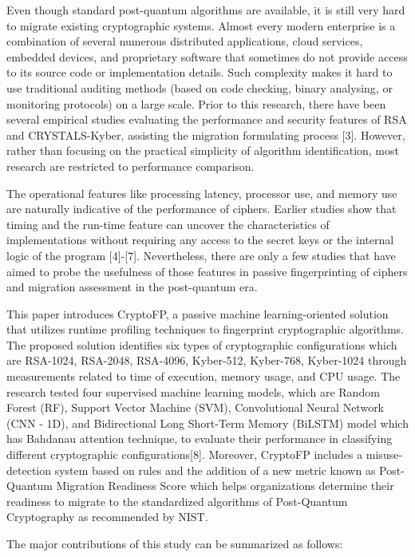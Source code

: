 \documentclass[conference]{IEEEtran}
\begin{document}
Even though standard post-quantum algorithms are available, it is still very hard to migrate existing cryptographic systems. Almost every modern enterprise is a combination of several numerous distributed applications, cloud services, embedded devices, and proprietary software that sometimes do not provide access to its source code or implementation details. Such complexity makes it hard to use traditional auditing methods (based on code checking, binary analysing, or monitoring protocols) on a large scale. Prior to this research, there have been several empirical studies evaluating the performance and security features of RSA and CRYSTALS-Kyber, assisting the migration formulating process [3]. However, rather than focusing on the practical simplicity of algorithm identification, most research are restricted to performance comparison.

The operational features like processing latency, processor use, and memory use are naturally indicative of the performance of ciphers. Earlier studies show that timing and the run-time feature can uncover the characteristics of implementations without requiring any access to the secret keys or the internal logic of the program [4]-[7]. Nevertheless, there are only a few studies that have aimed to probe the usefulness of those features in passive fingerprinting of ciphers and migration assessment in the post-quantum era.

This paper introduces CryptoFP, a passive machine learning-oriented solution that utilizes runtime profiling techniques to fingerprint cryptographic algorithms. The proposed solution identifies six types of cryptographic configurations which are RSA-1024, RSA-2048, RSA-4096, Kyber-512, Kyber-768, Kyber-1024 through measurements related to time of execution, memory usage, and CPU usage. The research tested four supervised machine learning models, which are Random Forest (RF), Support Vector Machine (SVM), Convolutional Neural Network (CNN - 1D), and Bidirectional Long Short-Term Memory (BiLSTM) model which has Bahdanau attention technique, to evaluate their performance in classifying different cryptographic configurations[8]. Moreover, CryptoFP includes a misuse-detection system based on rules and the addition of a new metric known as Post-Quantum Migration Readiness Score which helps organizations determine their readiness to migrate to the standardized algorithms of Post-Quantum Cryptography as recommended by NIST. 

The major contributions of this study can be summarized as follows:
\end{document}
